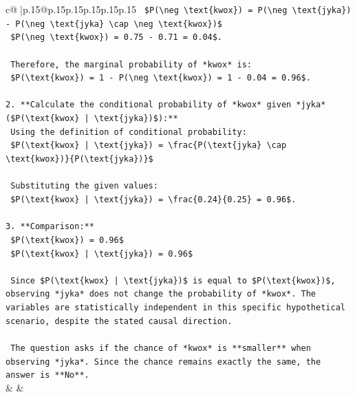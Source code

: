 \documentclass{article}
\begin{document}
{\begin{supertabular}{c@{$\;$}|p{.15\linewidth}@{}p{.15\linewidth}p{.15\linewidth}p{.15\linewidth}p{.15\linewidth}p{.15\linewidth}}
{{{\texttt{    \$P(\textbackslash{}neg \textbackslash{}text\{kwox\}) = P(\textbackslash{}neg \textbackslash{}text\{jyka\}) {-} P(\textbackslash{}neg \textbackslash{}text\{jyka\} \textbackslash{}cap \textbackslash{}neg \textbackslash{}text\{kwox\})\$} \\
\texttt{    \$P(\textbackslash{}neg \textbackslash{}text\{kwox\}) = 0.75 {-} 0.71 = 0.04\$.} \\
\\ 
\texttt{    Therefore, the marginal probability of *kwox* is:} \\
\texttt{    \$P(\textbackslash{}text\{kwox\}) = 1 {-} P(\textbackslash{}neg \textbackslash{}text\{kwox\}) = 1 {-} 0.04 = 0.96\$.} \\
\\ 
\texttt{2.  **Calculate the conditional probability of *kwox* given *jyka* (\$P(\textbackslash{}text\{kwox\} | \textbackslash{}text\{jyka\})\$):**} \\
\texttt{    Using the definition of conditional probability:} \\
\texttt{    \$P(\textbackslash{}text\{kwox\} | \textbackslash{}text\{jyka\}) = \textbackslash{}frac\{P(\textbackslash{}text\{jyka\} \textbackslash{}cap \textbackslash{}text\{kwox\})\}\{P(\textbackslash{}text\{jyka\})\}\$} \\
\\ 
\texttt{    Substituting the given values:} \\
\texttt{    \$P(\textbackslash{}text\{kwox\} | \textbackslash{}text\{jyka\}) = \textbackslash{}frac\{0.24\}\{0.25\} = 0.96\$.} \\
\\ 
\texttt{3.  **Comparison:**} \\
\texttt{    \$P(\textbackslash{}text\{kwox\}) = 0.96\$} \\
\texttt{    \$P(\textbackslash{}text\{kwox\} | \textbackslash{}text\{jyka\}) = 0.96\$} \\
\\ 
\texttt{    Since \$P(\textbackslash{}text\{kwox\} | \textbackslash{}text\{jyka\})\$ is equal to \$P(\textbackslash{}text\{kwox\})\$, observing *jyka* does not change the probability of *kwox*. The variables are statistically independent in this specific hypothetical scenario, despite the stated causal direction.} \\
\\ 
\texttt{    The question asks if the chance of *kwox* is **smaller** when observing *jyka*. Since the chance remains exactly the same, the answer is **No**.} \\
            }
        }
    }
    & & \\ \\


\end{supertabular}}
\end{document}
